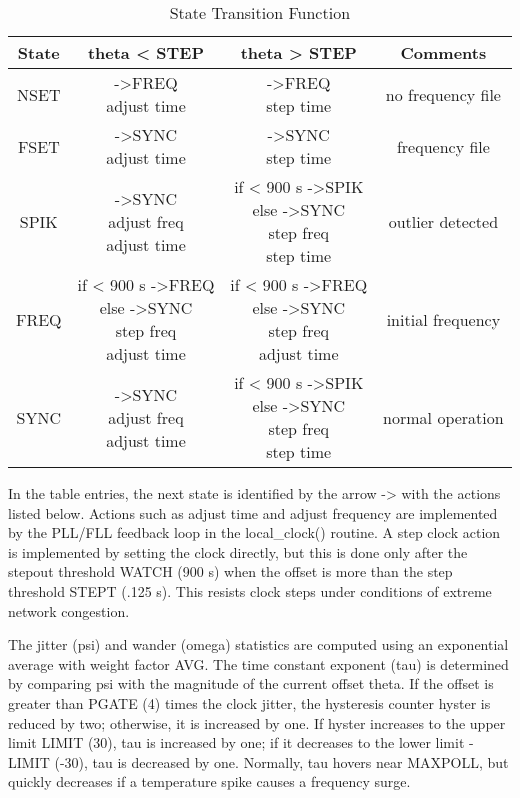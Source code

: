 \begin{table}[htb]
\center
\begin{tabular}{c | c | c | c}
State & theta < STEP        & theta > STEP      & Comments \\
\hline
\hline
NSET & \makecell{->FREQ \\ adjust time} & \makecell{->FREQ \\ step time} & no frequency file \\
FSET & \makecell{->SYNC \\ adjust time} & \makecell{->SYNC \\ step time} & frequency file \\
SPIK & \makecell{->SYNC \\ adjust freq \\ adjust time} & \makecell{if < 900 s ->SPIK \\ else ->SYNC \\ step freq \\ step time} & outlier detected \\
FREQ & \makecell{if < 900 s ->FREQ \\ else ->SYNC \\ step freq \\ adjust time} & \makecell{if < 900 s ->FREQ \\ else ->SYNC \\ step freq \\ adjust time} & initial frequency \\
SYNC & \makecell{->SYNC \\ adjust freq \\ adjust time} & \makecell{if < 900 s ->SPIK \\ else ->SYNC \\ step freq \\ step time} & normal operation \\
\hline
\end{tabular}
\label{state_transition_function}
\caption{State Transition Function}
\end{table}

In the table entries, the next state is identified by the arrow ->
with the actions listed below.  Actions such as adjust time and
adjust frequency are implemented by the PLL/FLL feedback loop in the
local\_clock() routine.  A step clock action is implemented by setting
the clock directly, but this is done only after the stepout threshold
WATCH (900 s) when the offset is more than the step threshold STEPT
(.125 s).  This resists clock steps under conditions of extreme
network congestion.

The jitter (psi) and wander (omega) statistics are computed using an
exponential average with weight factor AVG.  The time constant
exponent (tau) is determined by comparing psi with the magnitude of
the current offset theta.  If the offset is greater than PGATE (4)
times the clock jitter, the hysteresis counter hyster is reduced by
two; otherwise, it is increased by one.  If hyster increases to the
upper limit LIMIT (30), tau is increased by one; if it decreases to
the lower limit -LIMIT (-30), tau is decreased by one.  Normally, tau
hovers near MAXPOLL, but quickly decreases if a temperature spike
causes a frequency surge.
